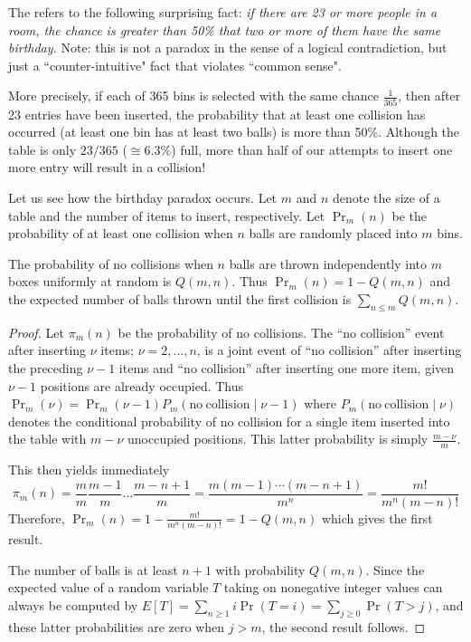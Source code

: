 The  refers to the following surprising fact:
\emph{if there are 23 or more people in a room, the chance is greater than 50\%
that two or more of them have the same birthday.} Note: this is not a paradox 
in the sense of a logical contradiction, but just a ``counter-intuitive" 
fact that violates ``common sense".

More precisely, if each of 365 bins
is selected with the same chance \(\frac{1}{365}\), then after
23 entries have been inserted, the probability that at least one collision has 
occurred (at least one bin has at least two balls) is more than 50\%. 
Although the table is only $23/365$ ($\cong 6.3\%$) full,
more than half of our attempts to insert one more entry will result in a collision!

Let us see how the birthday paradox occurs. Let \(m\) and \(n\) denote the 
size of a table and the number of items to insert, respectively. 
Let $\Pr_{m}(n)$ be the probability of at least one collision when 
$n$ balls are randomly placed into  $m$ bins.

\begin{Lemma}
The probability of no collisions when $n$ balls are thrown independently 
into $m$ boxes uniformly at random is $Q(m, n)$. Thus 
${\Pr_m}(n) =  1 - Q(m,n)$
and the expected number of balls thrown until the first collision is 
$\sum_{n\leq m} Q(m,n)$. 
\end{Lemma}

\begin{proof} Let $\pi_{m}(n)$ be the probability of no collisions.
 The ``no collision'' event after
inserting \(\nu\) items; \(\nu=2,\ldots,n\), is a joint event of
``no collision'' after inserting the preceding \(\nu-1\) items and 
``no collision'' after inserting one more item, given \(\nu-1\)
positions are already occupied. Thus 
\(\Pr_m(\nu)=\Pr_m(\nu-1)P_{m}(\mathrm{no~collision} \mid \nu-1)\)
where \(P_{m}(\mathrm{no~collision} \mid \nu)\) denotes the conditional
probability of no collision for a single item inserted into the
table with \(m-\nu\) unoccupied positions. This latter
probability is simply \(\frac{m-\nu}{m}\).

This then yields immediately
\[
\pi_{m}(n) = \frac{m}{m}\frac{m-1}{m} \dots \frac{m-n+1}{m} = 
\frac{m(m-1)\cdots(m-n+1)}{m^{n}} =  \frac{m!}{m^{n}(m-n)!}
\]
Therefore,
\(
\Pr_{m}(n) = 1 - \frac{m!}{m^{n}(m-n)!} = 1 - Q(m,n)
\)
which gives the first result.

The number of balls is at least $n+1$ with probability $Q(m,n)$. Since the 
expected value of a random variable $T$ taking on nonegative integer values 
 can always be computed by $E[T] = \sum_{n\geq 1} i \Pr(T=i) = 
 \sum_{j\geq 0} \Pr(T>j)$, and these latter probabilities are zero when $j>m$,
 the second result follows.
\end{proof}

